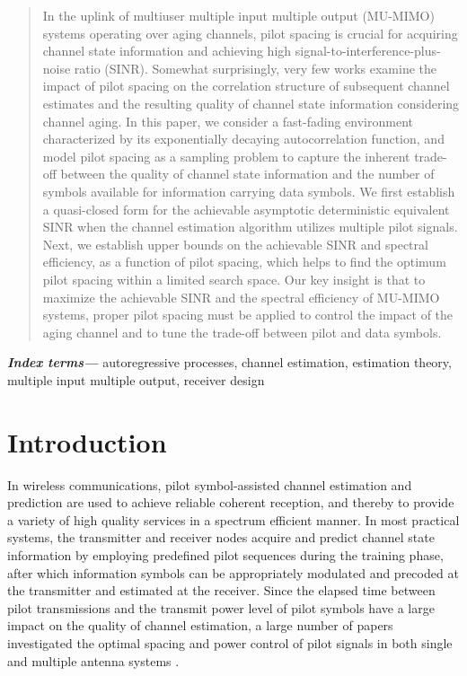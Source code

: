 \documentclass[conference, a4paper, 10pt]{IEEEtran}
\providecommand{\keywords}[1]{\textbf{\textit{Index terms---}} #1}
\begin{document}
\begin{abstract}
In the uplink of multiuser multiple input multiple output (MU-MIMO) systems operating over aging channels, pilot spacing is crucial for acquiring channel state information and achieving high signal-to-interference-plus-noise ratio (SINR). Somewhat surprisingly, very few works examine the impact of pilot spacing on the correlation structure of subsequent channel estimates and the resulting quality of channel state information considering channel aging. In this paper, we consider a fast-fading environment characterized by its exponentially decaying autocorrelation function, and model pilot spacing as a sampling problem to capture the inherent trade-off between the quality of channel state information and the number of symbols available for information carrying data symbols. We first establish a quasi-closed form for the achievable asymptotic deterministic equivalent SINR when the channel estimation algorithm utilizes multiple pilot signals. Next, we establish upper bounds on the achievable SINR and spectral efficiency, as a function of pilot spacing, which helps to find the optimum pilot spacing within a limited search space. Our key insight is that to maximize the achievable SINR and the spectral efficiency of MU-MIMO systems, proper pilot spacing must be applied to control the impact of the aging channel and to tune the trade-off between pilot and data symbols.
\end{abstract}
\keywords{autoregressive processes, channel estimation, estimation theory, multiple input multiple output, receiver design}

\section{Introduction}
In wireless communications, pilot symbol-assisted channel estimation and prediction are used to achieve
reliable coherent reception, and thereby to provide a variety of high quality services in a spectrum efficient
manner. In most practical systems, the transmitter and receiver nodes acquire and predict channel state information
by employing predefined pilot sequences during the training phase, after which information symbols can be
appropriately modulated and precoded at the transmitter and estimated at the receiver.
Since the elapsed time between pilot transmissions and the transmit power level of pilot symbols have a
large impact on the quality of channel estimation, a large number of papers investigated the optimal
spacing and power control of pilot signals in both single and multiple antenna systems
\cite{Yan:01, Zhang:07B, Abeida:10, Hijazi:10, GH:12,Truong:13, Kong:2015, Chiu:15, Kashyap:17, Kim:20, Yuan:20, Fodor:21}.
\end{document}
